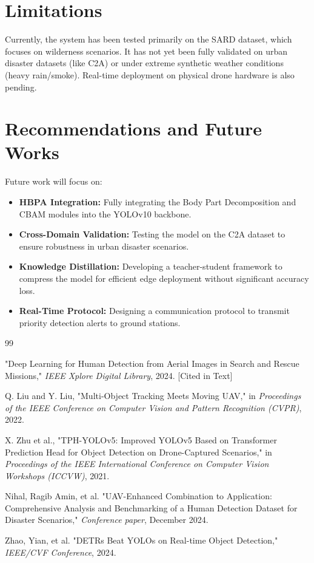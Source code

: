 \documentclass[12pt, a4paper]{report}
\begin{document}
\section{Limitations}
Currently, the system has been tested primarily on the SARD dataset, which focuses on wilderness scenarios. It has not yet been fully validated on urban disaster datasets (like C2A) or under extreme synthetic weather conditions (heavy rain/smoke). Real-time deployment on physical drone hardware is also pending.

\section{Recommendations and Future Works}
Future work will focus on:
\begin{itemize}
    \item \textbf{HBPA Integration:} Fully integrating the Body Part Decomposition and CBAM modules into the YOLOv10 backbone.
    \item \textbf{Cross-Domain Validation:} Testing the model on the C2A dataset to ensure robustness in urban disaster scenarios.
    \item \textbf{Knowledge Distillation:} Developing a teacher-student framework to compress the model for efficient edge deployment without significant accuracy loss.
    \item \textbf{Real-Time Protocol:} Designing a communication protocol to transmit priority detection alerts to ground stations.
\end{itemize}

\newpage
\begin{thebibliography}{99}

"Deep Learning for Human Detection from Aerial Images in Search and Rescue Missions," \textit{IEEE Xplore Digital Library}, 2024. [Cited in Text]

Q. Liu and Y. Liu, "Multi-Object Tracking Meets Moving UAV," in \textit{Proceedings of the IEEE Conference on Computer Vision and Pattern Recognition (CVPR)}, 2022.

X. Zhu et al., "TPH-YOLOv5: Improved YOLOv5 Based on Transformer Prediction Head for Object Detection on Drone-Captured Scenarios," in \textit{Proceedings of the IEEE International Conference on Computer Vision Workshops (ICCVW)}, 2021.

Nihal, Ragib Amin, et al. "UAV-Enhanced Combination to Application: Comprehensive Analysis and Benchmarking of a Human Detection Dataset for Disaster Scenarios," \textit{Conference paper}, December 2024.

Zhao, Yian, et al. "DETRs Beat YOLOs on Real-time Object Detection," \textit{IEEE/CVF Conference}, 2024.

\end{thebibliography}
\end{document}
